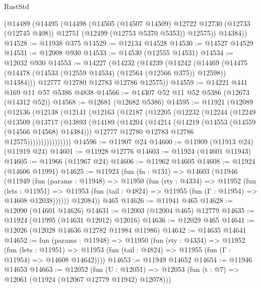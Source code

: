 \begin{lexlean}{RustStd}
\begin{coremodule}
{\begin{coremodule}
{{{{{{{{{{{{{{{{{{{{{{{{{{{{{{{{{{{{{{{{{{{{{{{{{{{{{{{{{{{{{{{{{{{{{{{{{{{{{{{{    (@14489
      (@14495
        (@14498
          (@14505
            (@14507 @14509)
            @12722
            @12730
            (@12733 (@12745 @408))
            @12751
            (@12499 (@12753 @5370 @5353))
            @12575))
        @14384))
@14528 := @11938 @375
@14529 := @12134 @14528
@14530 := @14527 @14529
@14531 := @12008 @930
@14533 := @14530 (@12555 @14531)
@14534 := @12032 @930
@14553 := @14227
    (@14232
      (@14239
        (@14242
          (@14469 (@14475 (@14478 (@14533 (@12559 @14534) (@12564 (@12566 @375)) @12598)) @14384)))
        @12777
        @12780
        @12783
        @12786
        @12575))
@14559 := @14221 @441 @169 @11 @57 @5386 @4838
@14566 := @14307 @52 @11 @52 @5386 (@12673 (@14312 @52))
@14568 := @12681 (@12682 @5386)
@14595 := @11921
    (@12089
      (@12136
        (@12138
          (@12141
            (@12163
              (@12187
                (@12205
                  (@12232
                    (@12244
                      (@12249
                        (@13509
                          (@13717
                            (@13893
                              (@14189
                                (@14204
                                  (@14214
                                    (@14219 (@14553 (@14559 (@14566 @14568) @14384)))
                                    @12777
                                    @12780
                                    @12783
                                    @12786
                                    @12575))))))))))))))))
@14596 := @11907 @24
@14600 := @11909 (@11913 @24) (@11919 @24)
@14601 := @11928 @12776
@14603 := @11924 (@14601 @11943)
@14605 := @11966 (@11967 @24)
@14606 := @11962 @14605
@14608 := @11924 (@14606 @11991)
@14625 := @11923
    (fun (fn : @131) =>
    @14603
      (@11946
        (@11949
          (fun (params : @11948) =>
          @11950
            (fun (rty : @4334) =>
            @11952
              (fun (lets : @11951) =>
              @11953 (fun (tail : @4824) => @11955 (fun (Γ : @11954) => @14608 @12038))))))
        @12084))
    @465
@14626 := @11941 @465
@14628 := @12090 (@14601 @14626)
@14631 := @12003 (@12004 @465) @12779
@14635 := @11924 (@11995 (@14631 @12012) @12016)
@14636 := @12029 @465
@14641 := @12026 (@12028 @14636 @12782 @11984 @11986)
@14642 := @14635 @14641
@14652 := fun (params : @11948) =>
  @11950
    (fun (rty : @4334) =>
    @11952
      (fun (lets : @11951) =>
      @11953 (fun (tail : @4824) => @11955 (fun (Γ : @11954) => @14608 @14642))))
@14653 := @11949 @14652
@14654 := @11946 @14653
@14663 := @12052
    (fun (U : @12051) => @12053 (fun (t : @7) => @12061 (@11924 (@12067 @12779 @11942) @12078)))
}}}}}}}}}}}}}}}}}}}}}}}}}}}}}}}}}}}}}}}}}}}}}}}}}}}}}}}}}}}}}}}}}}}}}}}}}}}}}}}}
\end{coremodule}}
\end{coremodule}
\end{lexlean}
